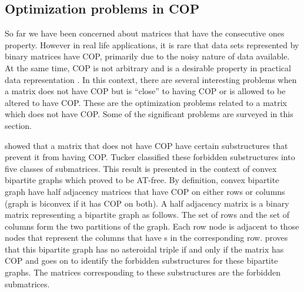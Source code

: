 \documentclass[MS,synopsis]{iitmdiss}
\begin{document}
\subsection{Optimization problems in COP}
\label{sec:optcop}
\vspace{\secfirstparatrim}  
So far we have been concerned about matrices that have the consecutive
ones property. However in real life applications, it is rare that data
sets represented by binary matrices have COP, primarily due to the
noisy nature of data available. At the same time, COP is not arbitrary
and is a desirable property in practical data representation
\cite{co98,jkckv04,k77}. In this context, there are several
interesting problems when a matrix does not have COP but is ``close''
to having COP or is allowed to be altered to have COP. These are the
optimization problems related to a matrix which does not have
COP. Some of the significant problems are surveyed in this section.

 \cite{at72} showed that a matrix that
does not have COP have certain substructures that prevent it from
having COP. Tucker classified these forbidden substructures into five
classes of submatrices. This result is presented in the context of
convex bipartite graphs which \cite{at72} proved to be
AT-free. By
definition, convex bipartite graph have half adjacency matrices that
have COP on either rows or columns (graph is biconvex if it has COP on
both)\cite{d08phd}. A half adjacency matrix is a binary matrix
representing a bipartite graph as follows. The set of rows and the set
of columns form the two partitions of the graph. Each row node is
adjacent to those nodes that represent the columns that have {\un}s in
the corresponding row. \cite{at72} proves that this bipartite graph
has no asteroidal triple if and only if the matrix has COP and goes on
to identify the forbidden substructures for these bipartite
graphs. The matrices corresponding to these substructures are the
forbidden submatrices.
\end{document}
